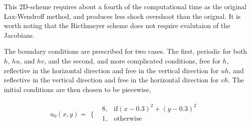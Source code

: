 This 2D-scheme requires about a fourth of the computational time as the original Lax-Wendroff method, and produces less shock
overshoot than the orignal\cite{Roach}. It is worth noting that the Ricthmeyer scheme does not require evalutaion
of the Jacobians. 
\newline

The boundary conditions are prescribed for two cases. The first, periodic for both $h$, $hu$, and $hv$, and the second,
and more complicated conditions, free for $h$, reflective in the horizontal direction and free in the vertical direction 
for $uh$, and reflective in the vertical direction and free in the horizontal direction for $vh$. 
The initial conditions are then chosen to be piecewise, 

\begin{equation}\label{eqn:12}
u_0(x,y)=
\begin{array}{ll}
\Big\{ & 
\begin{array}{ll}
 8, & \text{if} (x-0.3)^2+(y-0.3)^2 \\
 1, & \text{otherwise} \\
\end{array}
\end{array}
\end{equation}

